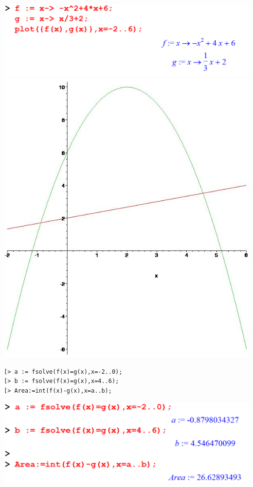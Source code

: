 \documentclass[
]{book}
\theoremstyle{definition}
\theoremstyle{definition}
\theoremstyle{definition}
\theoremstyle{definition}
\theoremstyle{remark}
\begin{document}
\includegraphics{figures/Lesson 6/fig28.png}
\includegraphics{figures/Lesson 6/fig29.jpg}

\begin{verbatim}
[> a := fsolve(f(x)=g(x),x=-2..0);
[> b := fsolve(f(x)=g(x),x=4..6);
[> Area:=int(f(x)-g(x),x=a..b);
\end{verbatim}

\includegraphics{figures/Lesson 6/fig31.png}
\end{document}
